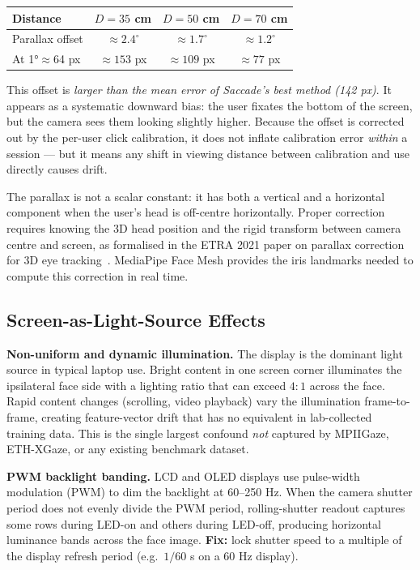 \documentclass[11pt,a4paper]{article}
\begin{document}
\begin{center}
\begin{tabular}{lccc}
\hline
\textbf{Distance} & $D=35$ cm & $D=50$ cm & $D=70$ cm \\
\hline
Parallax offset & $\approx2.4^\circ$ & $\approx1.7^\circ$ & $\approx1.2^\circ$ \\
At 1°$\approx$64 px & $\approx153$ px & $\approx109$ px & $\approx77$ px \\
\hline
\end{tabular}
\end{center}

This offset is \emph{larger than the mean error of Saccade's best method (142 px)}.
It appears as a systematic downward bias: the user fixates the bottom of the screen,
but the camera sees them looking slightly higher.
Because the offset is corrected out by the per-user click calibration, it does not
inflate calibration error \emph{within} a session — but it means any shift in
viewing distance between calibration and use directly causes drift.

The parallax is not a scalar constant: it has both a vertical and a horizontal
component when the user's head is off-centre horizontally.
Proper correction requires knowing the 3D head position and the rigid transform
between camera centre and screen, as formalised in
the ETRA 2021 paper on parallax correction for 3D eye tracking~\cite{crane2021parallax}.
MediaPipe Face Mesh provides the iris landmarks needed to compute this correction
in real time.

\subsection{Screen-as-Light-Source Effects}
\label{subsec:screenlight}

\textbf{Non-uniform and dynamic illumination.}
The display is the dominant light source in typical laptop use.
Bright content in one screen corner illuminates the ipsilateral face side with
a lighting ratio that can exceed $4{:}1$ across the face.
Rapid content changes (scrolling, video playback) vary the illumination frame-to-frame,
creating feature-vector drift that has no equivalent in lab-collected training data.
This is the single largest confound \emph{not} captured by MPIIGaze, ETH-XGaze,
or any existing benchmark dataset.

\textbf{PWM backlight banding.}
\label{subsec:pwm}
LCD and OLED displays use pulse-width modulation (PWM) to dim the backlight at
60--250 Hz.
When the camera shutter period does not evenly divide the PWM period,
rolling-shutter readout captures some rows during LED-on and others during LED-off,
producing horizontal luminance bands across the face image.
\textbf{Fix:} lock shutter speed to a multiple of the display refresh period
(e.g.\ $1/60$ s on a 60 Hz display).
\end{document}
